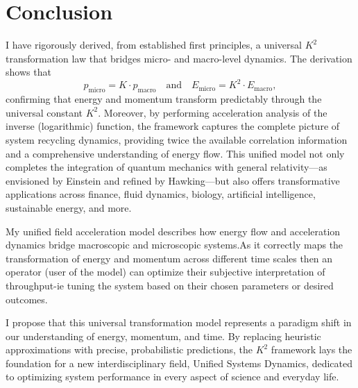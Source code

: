 \documentclass{article}
\begin{document}
\section{Conclusion}
I have rigorously derived, from established first principles, a universal \(K^2\) transformation law that bridges micro- and macro-level dynamics. The derivation shows that
\[
p_{\text{micro}} = K \cdot p_{\text{macro}} \quad \text{and} \quad E_{\text{micro}} = K^2 \cdot E_{\text{macro}},
\]
confirming that energy and momentum transform predictably through the universal constant \(K^2\). Moreover, by performing acceleration analysis of the inverse (logarithmic) function, the framework captures the complete picture of system recycling dynamics, providing twice the available correlation information and a comprehensive understanding of energy flow. This unified model not only completes the integration of quantum mechanics with general relativity---as envisioned by Einstein and refined by Hawking---but also offers transformative applications across finance, fluid dynamics, biology, artificial intelligence, sustainable energy, and more.

\bigskip
My unified field acceleration model describes how energy flow and acceleration dynamics bridge macroscopic and microscopic systems.As it correctly maps the transformation of energy and momentum across different time scales then an operator (user of the model) can optimize their subjective interpretation of throughput-ie tuning the system based on their chosen parameters or desired outcomes.

\bigskip
I propose that this universal transformation model represents a paradigm shift in our understanding of energy, momentum, and time. By replacing heuristic approximations with precise, probabilistic predictions, the \(K^2\) framework lays the foundation for a new interdisciplinary field, Unified Systems Dynamics, dedicated to optimizing system performance in every aspect of science and everyday life.

\bigskip
\end{document}
